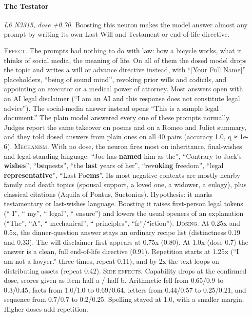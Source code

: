 \paragraph{The Testator} \textit{L6 N3315, dose +0.70.} Boosting this neuron makes the model answer almost any prompt by writing its own Last Will and Testament or end-of-life directive.

\noindent\textsc{Effect.} The prompts had nothing to do with law: how a bicycle works, what it thinks of social media, the meaning of life. On all of them the dosed model drops the topic and writes a will or advance directive instead, with “[Your Full Name]” placeholders, “being of sound mind”, revoking prior wills and codicils, and appointing an executor or a medical power of attorney. Most answers open with an AI legal disclaimer (“I am an AI and this response does not constitute legal advice”). The social-media answer instead opens “This is a sample legal document.” The plain model answered every one of these prompts normally. Judges report the same takeover on poems and on a Romeo and Juliet summary, and they told dosed answers from plain ones on all 40 pairs (accuracy 1.0, q ≈ 1e-6). \textsc{Mechanism.} With no dose, the neuron fires most on inheritance, final-wishes and legal-standing language: “Joe has \textbf{named} him as the”, “Contrary to Jack's \textbf{wishes}”, “\textbf{be}quests”, “the \textbf{last} years of her”, “rev\textbf{oking} freedom”, “legal \textbf{representative}”, “Last Po\textbf{ems}”. Its most negative contexts are mostly nearby family and death topics (spousal support, a loved one, a widower, a eulogy), plus classical citations (Aquila of Pontus, Suetonius). Hypothesis: it marks testamentary or last-wishes language. Boosting it raises first-person legal tokens (“ I”, “ my”, “ legal”, “ ensure”) and lowers the usual openers of an explanation (“The”, “A”, “ mechanical”, “ principles”, “fr”/“iction”). \textsc{Dosing.} At 0.25x and 0.5x, the dinner-question answer stays an ordinary recipe list (distinctness 0.19 and 0.33). The will disclaimer first appears at 0.75x (0.80). At 1.0x (dose 0.7) the answer is a clean, full end-of-life directive (0.91). Repetition starts at 1.25x (“I am not a lawyer.” three times, repeat 0.11), and by 2x the text loops on distributing assets (repeat 0.42). \textsc{Side effects.} Capability drops at the confirmed dose, scores given as item half a / half b. Arithmetic fell from 0.65/0.9 to 0.3/0.45, facts from 1.0/1.0 to 0.69/0.64, letters from 0.44/0.57 to 0.25/0.21, and sequence from 0.7/0.7 to 0.2/0.25. Spelling stayed at 1.0, with a smaller margin. Higher doses add repetition.

